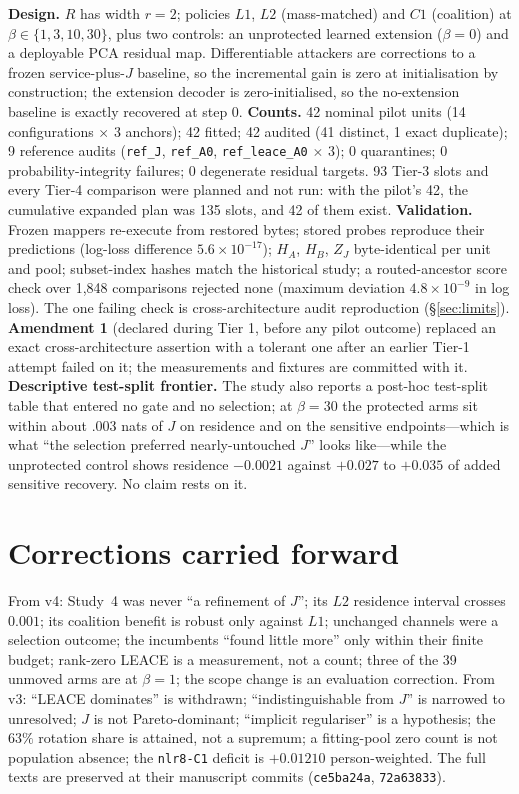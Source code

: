\documentclass[10pt]{article}
\begin{document}
\noindent \textbf{Design.} $R$ has width $r=2$; policies $L1$, $L2$ (mass-matched) and $C1$ (coalition) at
$\beta\in\{1,3,10,30\}$, plus two controls: an unprotected learned extension ($\beta=0$) and a deployable PCA
residual map. Differentiable attackers are corrections to a frozen service-plus-$J$ baseline, so the
incremental gain is zero at initialisation by construction; the extension decoder is zero-initialised, so the
no-extension baseline is exactly recovered at step 0.
\textbf{Counts.} 42 nominal pilot units (14 configurations $\times$ 3 anchors); 42 fitted; 42 audited (41
distinct, 1 exact duplicate); 9 reference audits (\texttt{ref\_J}, \texttt{ref\_A0}, \texttt{ref\_leace\_A0}
$\times$ 3); 0 quarantines; 0 probability-integrity failures; 0 degenerate residual targets. 93 Tier-3 slots
and every Tier-4 comparison were planned and not run: with the pilot's 42, the cumulative expanded plan was 135
slots, and 42 of them exist.
\textbf{Validation.} Frozen mappers re-execute from restored bytes; stored probes reproduce their predictions
(log-loss difference $5.6\times10^{-17}$); $H_A$, $H_B$, $Z_J$ byte-identical per unit and pool; subset-index
hashes match the historical study; a routed-ancestor score check over 1{,}848 comparisons rejected none
(maximum deviation $4.8\times10^{-9}$ in log loss). The one failing check is cross-architecture audit
reproduction (\S\ref{sec:limits}).
\textbf{Amendment 1} (declared during Tier 1, before any pilot outcome) replaced an exact cross-architecture
assertion with a tolerant one after an earlier Tier-1 attempt failed on it; the measurements and fixtures are
committed with it.
\textbf{Descriptive test-split frontier.} The study also reports a post-hoc test-split table that entered no
gate and no selection; at $\beta=30$ the protected arms sit within about $.003$ nats of $J$ on residence and on
the sensitive endpoints---which is what ``the selection preferred nearly-untouched $J$'' looks like---while the
unprotected control shows residence $-0.0021$ against $+0.027$ to $+0.035$ of added sensitive recovery. No
claim rests on it.

\section{Corrections carried forward}
\label{app:carried}
\noindent From v4: Study~4 was never ``a refinement of $J$''; its $L2$ residence interval crosses $0.001$; its
coalition benefit is robust only against $L1$; unchanged channels were a selection outcome; the incumbents
``found little more'' only within their finite budget; rank-zero LEACE is a measurement, not a count; three of
the 39 unmoved arms are at $\beta=1$; the scope change is an evaluation correction. From v3: ``LEACE dominates''
is withdrawn; ``indistinguishable from $J$'' is narrowed to unresolved; $J$ is not Pareto-dominant; ``implicit
regulariser'' is a hypothesis; the $63\%$ rotation share is attained, not a supremum; a fitting-pool zero count
is not population absence; the \texttt{nlr8-C1} deficit is $+0.01210$ person-weighted. The full texts are
preserved at their manuscript commits (\texttt{ce5ba24a}, \texttt{72a63833}).


\end{document}
